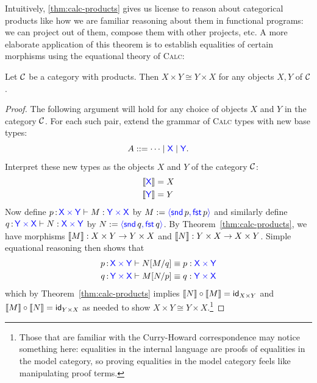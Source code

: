 Intuitively, \cref{thm:calc-products} gives us license to reason about categorical products 
like how we are familiar reasoning about them in functional programs: we can 
project out of them, compose them with other projects, etc.
A more elaborate application of this theorem is to establish equalities of 
certain morphisms using the equational theory of \textsc{Calc}:
\begin{proposition} \label{prop:product-comm-using-calc}
  Let \(\mathcal C\) be a category with products.
  Then \(X\times Y \cong Y \times X\)
  for any objects \(X,Y\) of \(\mathcal C\).
\end{proposition}
\begin{proof}
  The following argument will hold for any choice of objects 
  $X$ and $Y$ in the category $\mathcal C$.
  For each such pair,
  extend the grammar of \textsc{Calc} types with new base types:
  \[
  A ::= \dots \mid \mathsf{{\color{blue}X}} \mid \mathsf{{\color{blue}Y}}.
  \]
  Interpret these new types as the objects \(X\) and \(Y\) of the category \(\mathcal C\):
  \begin{align*}
    \left\llbracket \mathsf{{\color{blue}X}}\right\rrbracket &= X \\
    \left\llbracket \mathsf{{\color{blue}Y}}\right\rrbracket &= Y
  \end{align*}
  Now define \(p \,{:}\, \mathsf{{\color{blue}X}} \mathbin{{\color{blue}\times}} \mathsf{{\color{blue}Y}} \vdash M : \mathsf{{\color{blue}Y}} \mathbin{{\color{blue}\times}} \mathsf{{\color{blue}X}}\) by
  \(
  M := \plpair{\plsnd{p}}{\plfst{p}}
  \)
  and similarly define
  \(q \,{:}\, \mathsf{{\color{blue}Y}} \mathbin{{\color{blue}\times}} \mathsf{{\color{blue}X}} \vdash N : \mathsf{{\color{blue}X}} \mathbin{{\color{blue}\times}} \mathsf{{\color{blue}Y}}\) by
  \(N := \plpair{\plsnd{q}}{\plfst{q}}\).
  By Theorem~\ref{thm:calc-products},
  we have morphisms \(\left\llbracket M\right\rrbracket : X \times Y \to Y \times X\)
  and \(\left\llbracket N\right\rrbracket : Y \times X \to X \times Y\).
  Simple equational reasoning then shows that
  \begin{align}
    p\,{:}\,\mathsf{{\color{blue}X}}\mathbin{{\color{blue}\times}}\mathsf{{\color{blue}Y}} \vdash N[M/q] &\equiv p : \mathsf{{\color{blue}X}}\mathbin{{\color{blue}\times}}\mathsf{{\color{blue}Y}}
    \\
    q\,{:}\,\mathsf{{\color{blue}Y}}\mathbin{{\color{blue}\times}}\mathsf{{\color{blue}X}} \vdash M[N/p] &\equiv q : \mathsf{{\color{blue}Y}}\mathbin{{\color{blue}\times}}\mathsf{{\color{blue}X}}
  \end{align}
  which by Theorem~\ref{thm:calc-products}
  implies \(\left\llbracket N\right\rrbracket \circ \left\llbracket M\right\rrbracket = \mathsf{id}_{X\times Y}\)
  and \(\left\llbracket M\right\rrbracket \circ \left\llbracket N\right\rrbracket = \mathsf{id}_{Y\times X}\)
  as needed to show \(X \times Y \cong Y \times X\).\footnote{Those that are familiar 
  with the Curry-Howard correspondence may notice something here:
  equalities in the internal language are proofs of equalities in the model category, 
  so proving equalities in the model category feels like manipulating proof 
  terms.}
\end{proof}

